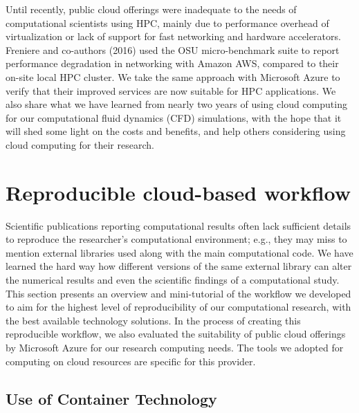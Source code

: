 \documentclass[10pt,journal,compsoc]{IEEEtran}
\begin{document}
Until recently, public cloud offerings were inadequate to the needs of computational scientists using HPC, mainly due to performance overhead of virtualization or lack of support for fast networking \cite{freniere_et_2016} and hardware accelerators.
Freniere and co-authors (2016) used the OSU micro-benchmark suite to report performance degradation in networking with Amazon AWS, compared to their on-site local HPC cluster.
We take the same approach with Microsoft Azure to verify that their improved services are now suitable for HPC applications.
We also share what we have learned from nearly two years of using cloud computing for our computational fluid dynamics (CFD) simulations, with the hope that it will shed some light on the costs and benefits, and help others considering using cloud computing for their research.

\section{Reproducible cloud-based workflow}\label{sec:workflow}

Scientific publications reporting computational results often lack sufficient details to reproduce the researcher's computational environment; e.g., they may miss to mention external libraries used along with the main computational code.
We have learned the hard way how different versions of the same external library can alter the numerical results and even the scientific findings of a computational study\cite{mesnard_barba_2017}.
This section presents an overview and mini-tutorial of the workflow we developed to aim for the highest level of reproducibility of our computational research, with the best available technology solutions. 
In the process of creating this reproducible workflow, we also evaluated the suitability of public cloud offerings by Microsoft Azure for our research computing needs. 
The tools we adopted for computing on cloud resources are specific for this provider. 

\subsection{Use of Container Technology}
\end{document}
